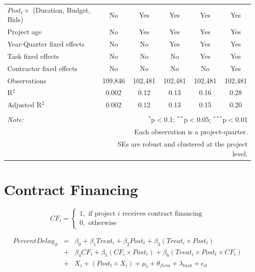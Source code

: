 \documentclass[]{article}
\begin{document}
\begin{table}[H]
\begin{tabular}{@{\extracolsep{-2pt}}lccccc}
$Post_t \times$  (Duration, Budget, Bids) & No & Yes & Yes & Yes & Yes \\ 
Project age & No & Yes & Yes & Yes & Yes \\ 
Year-Quarter fixed effects & No & No & Yes & Yes & Yes \\ 
Task fixed effects & No & No & No & Yes & Yes \\ 
Contractor fixed effects & No & No & No & No & Yes \\ 
Observations & 109,846 & 102,481 & 102,481 & 102,481 & 102,481 \\ 
R$^{2}$ & 0.002 & 0.12 & 0.13 & 0.16 & 0.28 \\ 
Adjusted R$^{2}$ & 0.002 & 0.12 & 0.13 & 0.15 & 0.20 \\ 
\hline 
\hline \\[-1.8ex] 
\textit{Note:}  & \multicolumn{5}{r}{$^{*}$p$<$0.1; $^{**}$p$<$0.05; $^{***}$p$<$0.01} \\ 
 & \multicolumn{5}{r}{Each observation is a project-quarter.} \\ 
 & \multicolumn{5}{r}{SEs are robust and clustered at the project level.} \\ 
\end{tabular} 
\end{table}

\hypertarget{contract-financing}{%
\section{Contract Financing}\label{contract-financing}}

\[ CF_i = \begin{cases} 1, \text{ if project } i \text{ receives contract financing}\\
0, \text{ otherwise} \end{cases}\]

\[ \begin{aligned}
PercentDelay_{it} &=& \beta_0+\beta_1 Treat_i + \beta_2 Post_t + \beta_3 (Treat_i \times Post_t) \\
&+&\beta_4 CF_i + \beta_5 (CF_i \times Post_t) + \beta_6 (Treat_i \times Post_t \times CF_i) \\ 
&+&X_i + (Post_t \times X_i) + \mu_t + \theta_{firm} + \lambda_{task}+ \epsilon_{it}
\end{aligned}\]
\end{document}

